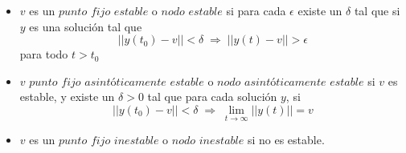 \documentclass[10pt,a4paper,notitlepage]{report}
\begin{document}
\begin{itemize}
\item $v$ es un $punto$ $fijo$ $estable$ o $nodo$ $estable$ si para cada $\epsilon$ existe un $\delta$ tal que si $y$ es una solución tal que 
\begin{equation}
|| y(t_{0}) - v || < \delta \; \Rightarrow \; || y(t) - v || > \epsilon
\end{equation}
para todo $t > t_{0}$
\item $v$ $punto$ $fijo$ $asintóticamente$ $estable$ o $nodo$ $asintóticamente$ $estable$ si $v$ es estable, y existe un $\delta > 0$ tal que para cada solución $y$, si
\begin{equation}
|| y(t_{0}) - v || < \delta \; \Rightarrow \; \lim\limits_{t \rightarrow \infty} || y(t)|| = v
\end{equation}
\item $v$ es un $punto$ $fijo$ $inestable$ o $nodo$ $inestable$ si no es estable.

\end{itemize}
\end{document}
